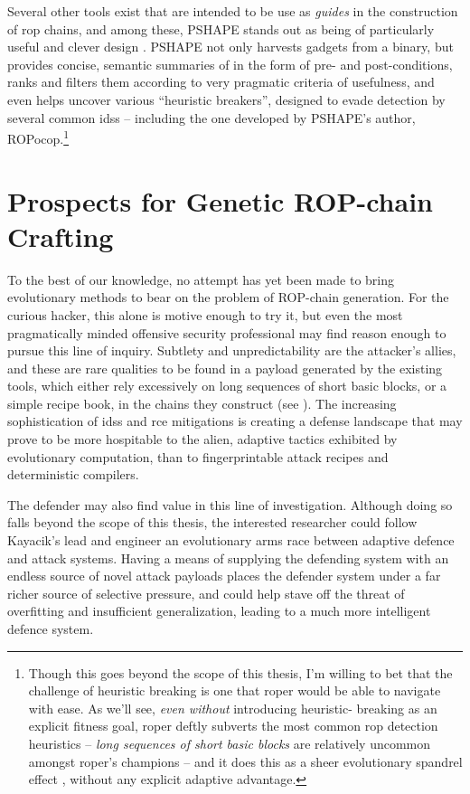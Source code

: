 \documentclass[12pt,glossary]{dalthesis}
\begin{document}
Several other tools exist that are intended to be use as \emph{guides} in the
construction of \gls{rop} chains, and among these, PSHAPE stands out as being
of particularly useful and clever design \cite{follner17}. PSHAPE not only
harvests gadgets from a binary, but provides concise, semantic summaries of
in the form of pre- and post-conditions, ranks and filters them according to
very pragmatic criteria of usefulness, and even helps uncover various ``heuristic 
breakers'', designed to evade detection by several common \glspl{ids} -- including
the one developed by PSHAPE's author, ROPocop.\footnote{Though this goes beyond the scope of this thesis, I'm willing to bet that
  the challenge of heuristic breaking is one that \gls{roper} would be able
  to navigate with ease. As we'll see, \emph{even without} introducing heuristic-
  breaking as an explicit fitness goal, \gls{roper} deftly subverts the most
  common \gls{rop} detection heuristics -- \emph{long sequences of short basic blocks}
  are relatively uncommon amongst \gls{roper}'s champions -- and it does this
  as a sheer evolutionary spandrel effect \cite{gould79}, without any explicit adaptive advantage.}

\section{Prospects for Genetic ROP-chain Crafting}
\label{sec:org3eb7bda}

To the best of our knowledge, no attempt has yet been made to bring evolutionary
methods to bear on the problem of ROP-chain generation. For the curious hacker,
this alone is motive enough to try it, but even the most pragmatically minded
offensive security professional may find reason enough to pursue this line of
inquiry. Subtlety and unpredictability are the attacker's allies, and these are
rare qualities to be found in a payload generated by the existing tools, which
either rely excessively on long sequences of short basic blocks, or a simple 
recipe book, in the chains they construct (see \cite{follner17}). The increasing
sophistication of \glspl{ids} and \gls{rce} mitigations is creating a defense landscape
that may prove to be more hospitable to the alien, adaptive tactics exhibited
by evolutionary computation, than to fingerprintable attack recipes and deterministic
compilers. 

The defender may also find value in this line of investigation. Although doing so
falls beyond the scope of this thesis, the interested researcher could follow
Kayacik's lead \cite{kayacik10} and engineer an evolutionary arms race between adaptive
defence and attack systems. Having a means of supplying the defending system with
an endless source of novel attack payloads places the defender system under a far
richer source of selective pressure, and could help stave off the threat of overfitting
and insufficient generalization, leading to a much more intelligent defence system. 
\end{document}
